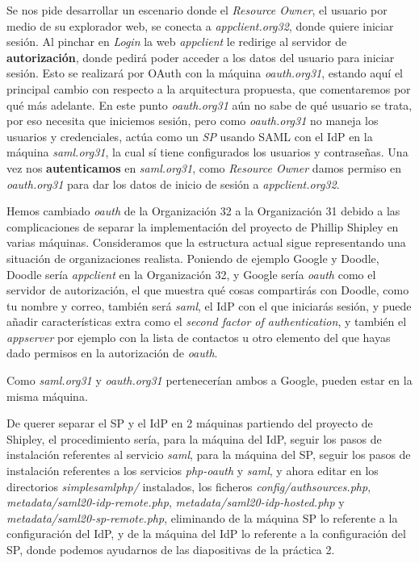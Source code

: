 \documentclass[]{article}
\begin{document}
Se nos pide desarrollar un escenario donde el \textit{Resource Owner}, el usuario por medio de su explorador web, se conecta a \textit{appclient.org32},
donde quiere iniciar sesión. Al pinchar en \textit{Login} la web \textit{appclient} le redirige al servidor de \textbf{autorización}, donde pedirá poder acceder
a los datos del usuario para iniciar sesión. Esto se realizará por OAuth con la máquina \textit{oauth.org31}, estando aquí el principal cambio con respecto
a la arquitectura propuesta, que comentaremos por qué más adelante. En este punto \textit{oauth.org31} aún no sabe de qué usuario se trata, por eso necesita que
iniciemos sesión, pero como \textit{oauth.org31} no maneja los usuarios y credenciales, actúa como un \textit{SP} usando SAML con el IdP en la máquina \textit{saml.org31},
la cual sí tiene configurados los usuarios y contraseñas. Una vez nos \textbf{autenticamos} en \textit{saml.org31}, como \textit{Resource Owner} damos permiso en
\textit{oauth.org31} para dar los datos de inicio de sesión a \textit{appclient.org32}.


\hfill

Hemos cambiado \textit{oauth} de la Organización 32 a la Organización 31 debido a las complicaciones de separar la implementación del proyecto de Phillip Shipley en varias máquinas. Consideramos que la estructura actual sigue representando una situación de organizaciones realista. Poniendo de ejemplo Google y Doodle,
Doodle sería \textit{appclient} en la Organización 32, y Google sería \textit{oauth} como el servidor de autorización, el que muestra qué cosas compartirás con Doodle, como tu nombre y correo,
también será \textit{saml}, el IdP con el que iniciarás sesión, y puede añadir características extra como el \textit{second factor of authentication}, y también el \textit{appserver} por ejemplo
con la lista de contactos u otro elemento del que hayas dado permisos en la autorización de \textit{oauth}.

Como \textit{saml.org31} y \textit{oauth.org31} pertenecerían ambos a Google, pueden estar en la misma máquina.

\hfill

De querer separar el SP y el IdP en 2 máquinas partiendo del proyecto de Shipley, el procedimiento sería, para la máquina del IdP, seguir los pasos de instalación referentes al servicio \textit{saml}, para la máquina del SP, seguir los pasos de instalación referentes a los servicios \textit{php-oauth} y \textit{saml}, y ahora editar en los directorios \textit{simplesamlphp/} instalados, los ficheros \textit{config/authsources.php}, \textit{metadata/saml20-idp-remote.php}, \textit{metadata/saml20-idp-hosted.php} y \textit{metadata/saml20-sp-remote.php}, eliminando de la máquina SP lo referente a la configuración del IdP, y de la máquina del IdP lo referente a la configuración del SP, donde podemos ayudarnos de las diapositivas de la práctica 2.
\end{document}
